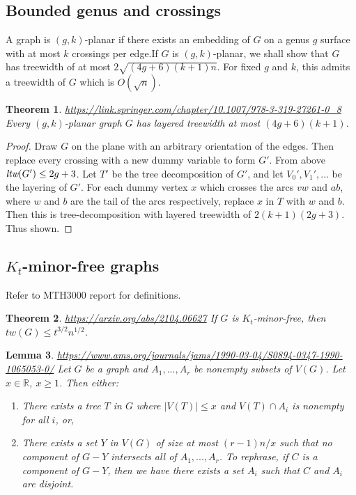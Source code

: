 \documentclass[]{article}
\newtheorem{theorem}{Theorem}
\newtheorem{lemma}[theorem]{Lemma}
\theoremstyle{definition}
\numberwithin{theorem}{section}
\numberwithin{equation}{section}
\begin{document}
\subsection{Bounded genus and crossings}
A graph is $(g, k)$-planar if there exists an embedding of $G$ on a genus $g$ surface with at most $k$ crossings per edge.If $G$ is $(g, k)$-planar, we shall show that $G$ has treewidth of at most $2\sqrt{(4g + 6)(k + 1) n}$. For fixed $g$ and $k$, this admits a treewidth of $G$ which is $O(\sqrt{n})$. 
\begin{theorem}{\url{https://link.springer.com/chapter/10.1007/978-3-319-27261-0_8}}
	Every $(g, k)$-planar graph $G$ has layered treewidth at most $(4g + 6)(k + 1)$. 
\end{theorem}

\begin{proof}
	Draw $G$ on the plane with an arbitrary orientation of the edges. Then replace every crossing with a new dummy variable to form $G'$. From above $\textit{ltw}(G') \leq 2g + 3$. Let $T'$ be the tree decomposition of $G'$, and let $V_0', V_1', ...$ be the layering of $G'$. For each dummy vertex $x$ which crosses the arcs $vw$ and $ab$, where $w$ and $b$ are the tail of the arcs respectively, replace $x$ in $T$ with $w$ and $b$. Then this is tree-decomposition with layered treewidth of $2(k+1) (2g + 3)$. Thus shown. 
\end{proof}

\subsection{$K_t$-minor-free graphs}
Refer to MTH3000 report for definitions.

\begin{theorem}{\url{https://arxiv.org/abs/2104.06627}}
	If $G$ is $K_t$-minor-free, then $tw(G) \leq t^{3/2} n^{1/2}$. 
\end{theorem} 

\begin{lemma}{\url{https://www.ams.org/journals/jams/1990-03-04/S0894-0347-1990-1065053-0/}}
	Let $G$ be a graph and $A_1, ..., A_r$ be nonempty subsets of $V(G)$. Let $x \in \mathbb{R}$, $x \geq 1$. Then either:
	\begin{enumerate}
		\item There exists a tree $T$ in $G$ where $|V(T)| \leq x$ and $V(T) \cap A_i$ is nonempty for all $i$, or,
		\item There exists a set $Y$ in $V(G)$ of size at most $(r-1)n/x$ such that no component of $G-Y$ intersects all of $A_1, ..., A_r$. To rephrase, if $C$ is a component of $G - Y$, then we have there exists a set $A_i$ such that $C$ and $A_i$ are disjoint. 
	\end{enumerate}
\end{lemma}
\end{document}
